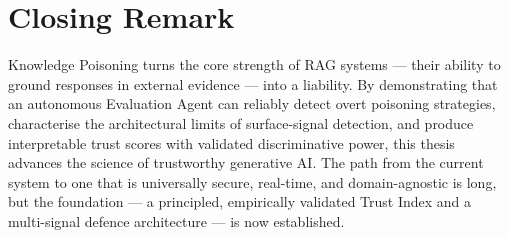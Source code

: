 \section{Closing Remark}

Knowledge Poisoning turns the core strength of RAG systems --- their ability to ground responses in external evidence --- into a liability. By demonstrating that an autonomous Evaluation Agent can reliably detect overt poisoning strategies, characterise the architectural limits of surface-signal detection, and produce interpretable trust scores with validated discriminative power, this thesis advances the science of trustworthy generative AI. The path from the current system to one that is universally secure, real-time, and domain-agnostic is long, but the foundation --- a principled, empirically validated Trust Index and a multi-signal defence architecture --- is now established.

